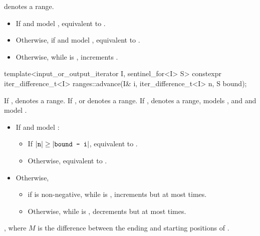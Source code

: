 \begin{itemdescr}
\pnum
\expects
{} denotes a range.

\pnum
\effects
\begin{itemize}
\item If  and  model ,
  equivalent to .
\item Otherwise, if  and  model ,
  equivalent to .
\item Otherwise, while  is ,
  increments .
\end{itemize}
\end{itemdescr}

%
\begin{itemdecl}
template<input_or_output_iterator I, sentinel_for<I> S>
  constexpr iter_difference_t<I> ranges::advance(I& i, iter_difference_t<I> n, S bound);
\end{itemdecl}

\begin{itemdescr}
\pnum
\expects
If ,  denotes a range.
If ,  or  denotes a range.
If ,  denotes a range,
 models , and
 and  model .

\pnum
\effects
\begin{itemize}
\item If  and  model :
  \begin{itemize}
  \item If \brk{}$|\texttt{n}| \ge |\texttt{bound - i}|$,
    equivalent to .
  \item Otherwise, equivalent to .
  \end{itemize}
\item Otherwise,
  \begin{itemize}
  \item if  is non-negative,
    while  is ,
    increments  but at most  times.
  \item Otherwise,
    while  is ,
    decrements  but at most  times.
  \end{itemize}
\end{itemize}

\pnum
\returns
{}, where $M$ is the difference between
the ending and starting positions of .
\end{itemdescr}

